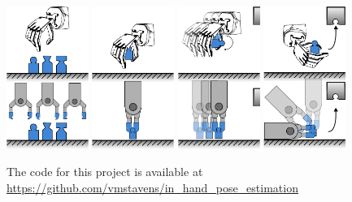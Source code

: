\begin{titlepage}
\begin{center}
        \vspace{2.0cm}
        \includegraphics[width=0.2\textwidth]{chapters/introduction/fig/pipeline-1.pdf}
        \includegraphics[width=0.2\textwidth]{chapters/introduction/fig/pipeline-2.pdf}
        \includegraphics[width=0.2\textwidth]{chapters/introduction/fig/pipeline-3.pdf}
        \includegraphics[width=0.2\textwidth]{chapters/introduction/fig/pipeline-4.pdf}
        \vspace{2.0cm}
        
        \begin{center}
        The code for this project is available at\\
        \url{https://github.com/vmstavens/in_hand_pose_estimation}
        \end{center}
        

\end{center}
\end{titlepage}
